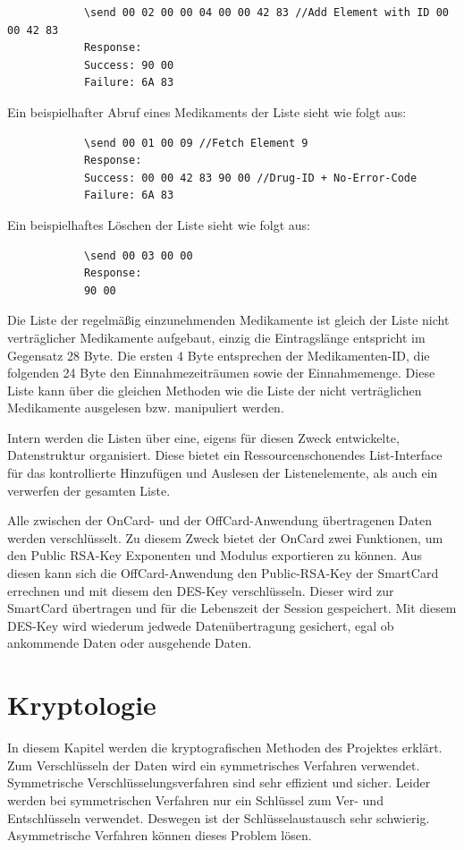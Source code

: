 \documentclass[parskip]{scrartcl}
\begin{document}
		\begin{lstlisting}
			\send 00 02 00 00 04 00 00 42 83 //Add Element with ID 00 00 42 83
			Response:
			Success: 90 00
			Failure: 6A 83
		\end{lstlisting}
		
		Ein beispielhafter Abruf eines Medikaments der Liste sieht wie folgt aus:
		
		\begin{lstlisting}
			\send 00 01 00 09 //Fetch Element 9
			Response:
			Success: 00 00 42 83 90 00 //Drug-ID + No-Error-Code
			Failure: 6A 83
		\end{lstlisting}
		
		Ein beispielhaftes Löschen der Liste sieht wie folgt aus:
			
		\begin{lstlisting}
			\send 00 03 00 00
			Response:
			90 00
		\end{lstlisting}
		
		Die Liste der regelmäßig einzunehmenden Medikamente ist gleich der Liste nicht verträg\-licher Medikamente aufgebaut, einzig die Eintragslänge entspricht im Gegensatz 28 Byte. Die ersten 4 Byte entsprechen der Medikamenten-ID, die folgenden 24 Byte den Einnahmezeiträumen sowie der Einnahmemenge. Diese Liste kann über die gleichen Methoden wie die Liste der nicht verträglichen Medikamente ausgelesen bzw. manipuliert werden.
		
		Intern werden die Listen über eine, eigens für diesen Zweck entwickelte, Datenstruktur organisiert. Diese bietet ein Ressourcenschonendes List-Interface für das kontrollierte Hinzufügen und Auslesen der Listenelemente, als auch ein verwerfen der gesamten Liste.
		
		Alle zwischen der OnCard- und der OffCard-Anwendung übertragenen Daten werden verschlüsselt. Zu diesem Zweck bietet der OnCard zwei Funktionen, um den Public RSA-Key Exponenten und Modulus exportieren zu können. Aus diesen kann sich die OffCard-Anwendung den Public-RSA-Key der SmartCard errechnen und mit diesem den DES-Key verschlüsseln. Dieser wird zur SmartCard übertragen und für die Lebenszeit der Session gespeichert. Mit diesem DES-Key wird wiederum jedwede Datenübertragung gesichert, egal ob ankommende Daten oder ausgehende Daten.
	\section{Kryptologie}
		In diesem Kapitel werden die kryptografischen Methoden des Projektes erklärt. Zum Verschlüsseln der Daten wird ein symmetrisches Verfahren verwendet. Symmetrische Verschlüsselungsverfahren sind sehr effizient und sicher. Leider werden bei symmet\-rischen Verfahren nur ein Schlüssel zum Ver- und Entschlüsseln verwendet. Deswegen ist der Schlüsselaustausch sehr schwierig. Asymmetrische Verfahren können dieses Problem lösen.
\end{document}
